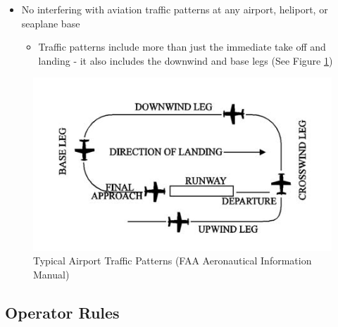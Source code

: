 \documentclass[
  12pt,
]{book}
\providecommand{\tightlist}{%
  \setlength{\itemsep}{0pt}\setlength{\parskip}{0pt}}
\begin{document}
\begin{itemize}
\tightlist
\item
  No interfering with aviation traffic patterns at any airport, heliport, or seaplane base

  \begin{itemize}
  \tightlist
  \item
    Traffic patterns include more than just the immediate take off and landing - it also includes the downwind and base legs (See Figure \ref{fig:traffic-patterns})
  \end{itemize}
\end{itemize}

\begin{figure}

{\centering \includegraphics[width=0.6\linewidth]{images/faa_traffic_pattern} 

}

\caption{Typical Airport Traffic Patterns (FAA Aeronautical Information Manual)}\label{fig:traffic-patterns}
\end{figure}

\hypertarget{operator-rules}{%
\subsection{Operator Rules}\label{operator-rules}}
\end{document}
